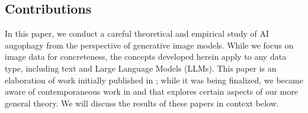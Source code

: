 \documentclass{article}
\begin{document}
\subsection{Contributions}
\label{sec:contributions}

In this paper, we conduct a careful theoretical and empirical study of AI augophagy from the perspective of generative image models.
While we focus on image data for concreteness, the concepts developed herein apply to any data type, including text and Large Language Models (LLMs).
This paper is an elaboration of work initially published in \cite{JosueMad1,JosueMad2}; while it was being finalized, we became aware of contemporaneous work in \cite{curse_of_recursion}
and 
\cite{towards_understanding,combining_generative} that explores certain aspects of our more general theory.
We will discuss the results of these papers in context below.


\end{document}

